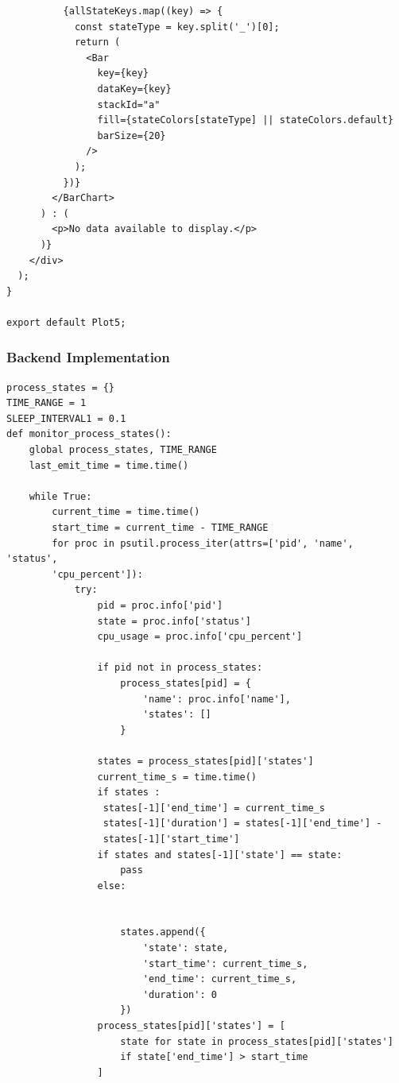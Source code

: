 \documentclass[12pt]{article}
\begin{document}
\begin{verbatim}
          {allStateKeys.map((key) => {
            const stateType = key.split('_')[0];
            return (
              <Bar
                key={key}
                dataKey={key}
                stackId="a"
                fill={stateColors[stateType] || stateColors.default}
                barSize={20}
              />
            );
          })}
        </BarChart>
      ) : (
        <p>No data available to display.</p>
      )}
    </div>
  );
}

export default Plot5;

\end{verbatim}
\subsubsection{Backend Implementation}

\begin{verbatim}
process_states = {}  
TIME_RANGE = 1  
SLEEP_INTERVAL1 = 0.1  
def monitor_process_states():
    global process_states, TIME_RANGE
    last_emit_time = time.time()  

    while True:
        current_time = time.time() 
        start_time = current_time - TIME_RANGE  
        for proc in psutil.process_iter(attrs=['pid', 'name', 'status',
        'cpu_percent']):
            try:
                pid = proc.info['pid']
                state = proc.info['status']
                cpu_usage = proc.info['cpu_percent']

                if pid not in process_states:
                    process_states[pid] = {
                        'name': proc.info['name'],
                        'states': []
                    }

                states = process_states[pid]['states']
                current_time_s = time.time()
                if states :
                 states[-1]['end_time'] = current_time_s
                 states[-1]['duration'] = states[-1]['end_time'] -
                 states[-1]['start_time']
                if states and states[-1]['state'] == state:
                    pass
                else:

                    
                    states.append({
                        'state': state,
                        'start_time': current_time_s,
                        'end_time': current_time_s,
                        'duration': 0  
                    })
                process_states[pid]['states'] = [
                    state for state in process_states[pid]['states']
                    if state['end_time'] > start_time  
                ]
                    

\end{verbatim}
\end{document}
